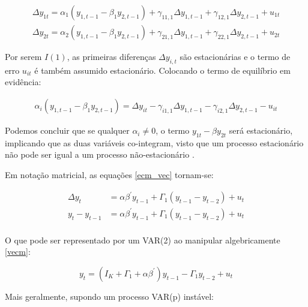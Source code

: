\documentclass[a4paper,
               article,
               12pt,
               openany,
               oneside,
               english,
               brazil]{abntex2}
\numberwithin{equation}{section}
\begin{document}
    \begin{equation}
        \begin{aligned}
            \label{ecm_vec}
            \Delta y_{1t} = \alpha_1 (y_{1,t-1} - \beta_1 y_{2, t-1}) + \gamma_{11,1} \Delta y_{1,t-1} + \gamma_{12,1} \Delta y_{2,t-1} + u_{1t} \\
            \Delta y_{2t} = \alpha_2 (y_{1,t-1} - \beta_1 y_{2, t-1}) + \gamma_{21,1} \Delta y_{1,t-1} + \gamma_{22,1} \Delta y_{2,t-1} + u_{2t}
        \end{aligned}
    \end{equation}

    Por serem $ I(1) $, as primeiras diferenças $ \Delta y_{i,t} $ são estacionárias e o termo de erro $ u_{it} $ é também assumido estacionário. Colocando o termo de equilíbrio em evidência:

    \begin{align*}
        \alpha_i (y_{1,t-1} - \beta_1 y_{2, t-1}) = \Delta y_{it} - \gamma_{i1,1} \Delta y_{1,t-1} - \gamma_{i2,1} \Delta y_{2,t-1} - u_{it}
    \end{align*}

    Podemos concluir que se qualquer $ \alpha_{i} \neq 0 $, o termo $ y_{1t} - \beta y_{2t} $ será estacionário, implicando que as duas variáveis co-integram, visto que um processo estacionário não pode ser igual a um processo não-estacionário \cite[p.~244-247]{lutkepool}.

    Em notação matricial, as equações \eqref{ecm_vec} tornam-se:

    \begin{equation}
        \label{vecm}
        \begin{aligned}
            \Delta y_t &= \alpha \beta^{'} y_{t-1} + \Gamma_1(y_{t-1} - y_{t-2}) + u_t \\
            y_t - y_{t-1} &= \alpha \beta^{'} y_{t-1} + \Gamma_1(y_{t-1} - y_{t-2}) + u_t \\
        \end{aligned}
    \end{equation}

    O que pode ser representado por um VAR(2) ao manipular algebricamente \eqref{vecm}:

    \begin{equation}
        \label{vecm-var}
        y_t = (I_K + \Gamma_1 + \alpha \beta^{'})y_{t-1} - \Gamma_1 y_{t-2} + u_t
    \end{equation}

    Mais geralmente, supondo um processo VAR(p) instável:
    
\end{document}
